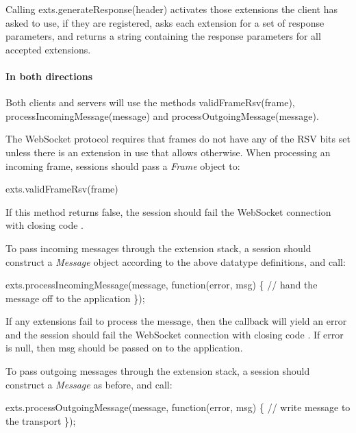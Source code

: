 Calling {\ttfamily exts.\+generate\+Response(header)} activates those extensions the client has asked to use, if they are registered, asks each extension for a set of response parameters, and returns a string containing the response parameters for all accepted extensions.

\paragraph*{In both directions}

Both clients and servers will use the methods {\ttfamily valid\+Frame\+Rsv(frame)}, {\ttfamily process\+Incoming\+Message(message)} and {\ttfamily process\+Outgoing\+Message(message)}.

The Web\+Socket protocol requires that frames do not have any of the {\ttfamily R\+SV} bits set unless there is an extension in use that allows otherwise. When processing an incoming frame, sessions should pass a {\itshape Frame} object to\+:


\begin{DoxyCode}
exts.validFrameRsv(frame)
\end{DoxyCode}


If this method returns {\ttfamily false}, the session should fail the Web\+Socket connection with closing code {}.

To pass incoming messages through the extension stack, a session should construct a {\itshape Message} object according to the above datatype definitions, and call\+:


\begin{DoxyCode}
exts.processIncomingMessage(message, function(error, msg) \{
  // hand the message off to the application
\});
\end{DoxyCode}


If any extensions fail to process the message, then the callback will yield an error and the session should fail the Web\+Socket connection with closing code {}. If {\ttfamily error} is {\ttfamily null}, then {\ttfamily msg} should be passed on to the application.

To pass outgoing messages through the extension stack, a session should construct a {\itshape Message} as before, and call\+:


\begin{DoxyCode}
exts.processOutgoingMessage(message, function(error, msg) \{
  // write message to the transport
\});
\end{DoxyCode}


